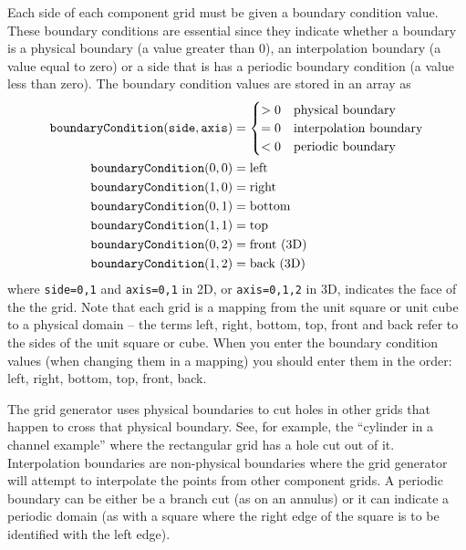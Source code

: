 \documentclass[xcolor=rgb,svgnames,dvipsnames]{article}
\newcommand{\Index}[1]{#1\index{#1}}
\begin{document}
   Each side of each component grid must be given a boundary condition value. These
boundary conditions are essential since they indicate whether a boundary is a 
physical boundary
 (a value greater than 0), an interpolation boundary (a value equal
to zero) or a side that is has a periodic boundary condition (a value less than zero). 
The \Index{boundary condition} values are stored in an array as
\begin{align*}
{\tt boundaryCondition}({\tt side},{\tt axis}) 
    &= \begin{cases}
        > 0 & \text{physical boundary} \\
        =0  & \text{interpolation boundary} \\
        < 0 & \text{periodic boundary} 
      \end{cases} \\
 {\tt boundaryCondition}(0,0) &= \text{left} \\ 
 {\tt boundaryCondition}(1,0) &= \text{right} \\ 
 {\tt boundaryCondition}(0,1) &= \text{bottom} \\ 
 {\tt boundaryCondition}(1,1) &= \text{top} \\ 
 {\tt boundaryCondition}(0,2) &= \text{front (3D)} \\ 
 {\tt boundaryCondition}(1,2) &= \text{back (3D)} 
\end{align*}
where {\tt side=0,1} and {\tt axis=0,1} in 2D, or {\tt axis=0,1,2} in 3D, indicates the face of the the grid.
Note that each grid is a mapping from the unit square or unit cube to a physical domain -- the terms left, right,
bottom, top, front and back refer to the sides of the unit square or cube.
When you enter the boundary condition values (when changing them in a mapping) you should enter
them in the order: left, right, bottom, top, front, back. 
   
The grid generator uses physical boundaries to cut holes in other grids that happen to cross that
physical boundary. See, for example, the ``cylinder in a channel example'' where the rectangular 
grid has a hole cut out of it.  Interpolation boundaries are non-physical boundaries where the
grid generator will attempt to interpolate the points from other component grids. A periodic boundary
can be either be a branch cut (as on an annulus) or it can indicate a periodic domain (as with a
square where the right edge of the square is to be identified with the left edge).


\end{document}
